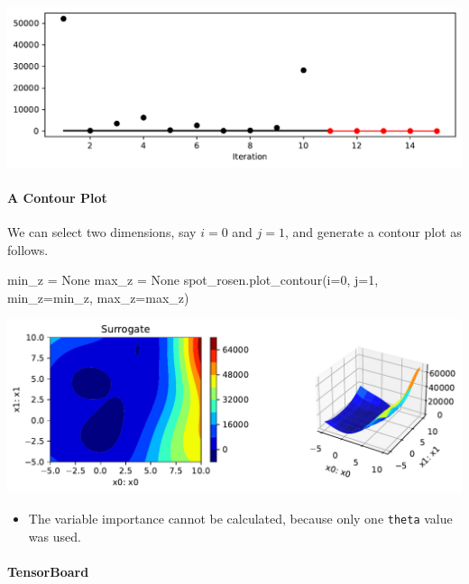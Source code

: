\documentclass[
  letterpaper,
  DIV=11,
  numbers=noendperiod]{scrreprt}
\let\oldparagraph\paragraph
\renewcommand{\paragraph}[1]{\oldparagraph{#1}\mbox{}}
\newenvironment{Shaded}{\begin{snugshade}}{\end{snugshade}}
\newcommand{\DecValTok}[1]{\textcolor[rgb]{0.68,0.00,0.00}{#1}}
\newcommand{\NormalTok}[1]{\textcolor[rgb]{0.00,0.23,0.31}{#1}}
\newcommand{\OperatorTok}[1]{\textcolor[rgb]{0.37,0.37,0.37}{#1}}
\newcommand{\VariableTok}[1]{\textcolor[rgb]{0.07,0.07,0.07}{#1}}
\providecommand{\tightlist}{%
  \setlength{\itemsep}{0pt}\setlength{\parskip}{0pt}}\usepackage{longtable,booktabs,array}
\begin{document}
\includegraphics{009_num_spot_anisotropic_files/figure-pdf/cell-19-output-1.pdf}

\paragraph{A Contour Plot}\label{a-contour-plot-2}

We can select two dimensions, say \(i=0\) and \(j=1\), and generate a
contour plot as follows.

\begin{Shaded}
\begin{Highlighting}[]
\NormalTok{min\_z }\OperatorTok{=} \VariableTok{None}
\NormalTok{max\_z }\OperatorTok{=} \VariableTok{None}
\NormalTok{spot\_rosen.plot\_contour(i}\OperatorTok{=}\DecValTok{0}\NormalTok{, j}\OperatorTok{=}\DecValTok{1}\NormalTok{, min\_z}\OperatorTok{=}\NormalTok{min\_z, max\_z}\OperatorTok{=}\NormalTok{max\_z)}
\end{Highlighting}
\end{Shaded}

\includegraphics{009_num_spot_anisotropic_files/figure-pdf/cell-20-output-1.pdf}

\begin{itemize}
\tightlist
\item
  The variable importance cannot be calculated, because only one
  \texttt{theta} value was used.
\end{itemize}

\paragraph{TensorBoard}\label{tensorboard-5}
\end{document}
